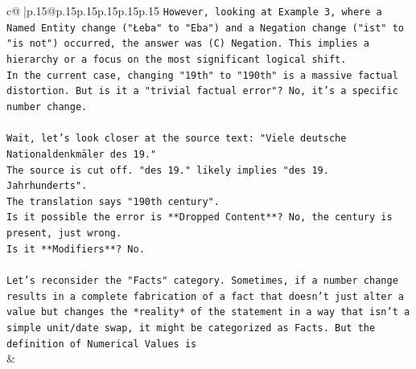 \documentclass{article}
\begin{document}
{\begin{supertabular}{c@{$\;$}|p{.15\linewidth}@{}p{.15\linewidth}p{.15\linewidth}p{.15\linewidth}p{.15\linewidth}p{.15\linewidth}}
{{{\texttt{However, looking at Example 3, where a Named Entity change ("Łeba" to "Eba") and a Negation change ("ist" to "is not") occurred, the answer was (C) Negation. This implies a hierarchy or a focus on the most significant logical shift.} \\
\texttt{In the current case, changing "19th" to "190th" is a massive factual distortion. But is it a "trivial factual error"? No, it's a specific number change.} \\
\\ 
\texttt{Wait, let's look closer at the source text: "Viele deutsche Nationaldenkmäler des 19."} \\
\texttt{The source is cut off. "des 19." likely implies "des 19. Jahrhunderts".} \\
\texttt{The translation says "190th century".} \\
\texttt{Is it possible the error is **Dropped Content**? No, the century is present, just wrong.} \\
\texttt{Is it **Modifiers**? No.} \\
\\ 
\texttt{Let's reconsider the "Facts" category. Sometimes, if a number change results in a complete fabrication of a fact that doesn't just alter a value but changes the *reality* of the statement in a way that isn't a simple unit/date swap, it might be categorized as Facts. But the definition of Numerical Values is} \\
            }
        }
    }
    & \\ \\

\end{supertabular}
}
\end{document}
